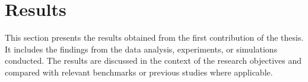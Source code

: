 \section{Results}
\label{sec::Contribution1_Results}

This section presents the results obtained from the first contribution of the thesis. It includes the findings from the data analysis, experiments, or simulations conducted. The results are discussed in the context of the research objectives and compared with relevant benchmarks or previous studies where applicable.   
